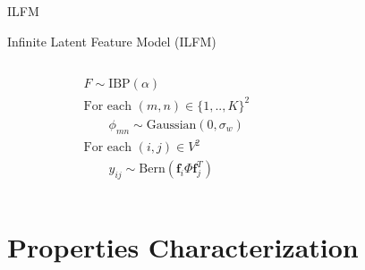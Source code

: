 \begin{frame}[c]{ILFM}

    Infinite Latent Feature Model (ILFM) 
    \vspace{1cm}

    \begin{columns}[t]
        \begin{column}{0.5\textwidth}
            \vspace{-4cm}
            \begin{align*}
                &F \sim \textrm{IBP}(\alpha)\\
                &\textrm{For each }  (m,n) \in \{1,..,K\}^2 \\
                &\qquad\phi_{mn} \sim \mathrm{Gaussian}(0,\sigma_w)\\
                &\textrm{For each } (i,j) \in V^2 \\
                &\qquad y_{ij} \sim \mathrm{Bern}(\bm{f}_i \Phi \bm{f}_j^T)
            \end{align*}
        \end{column}
        \begin{column}{0.5\textwidth}
            \scalebox{0.88}{}
        \end{column}
    \end{columns}
\end{frame}

\section{Properties Characterization}



